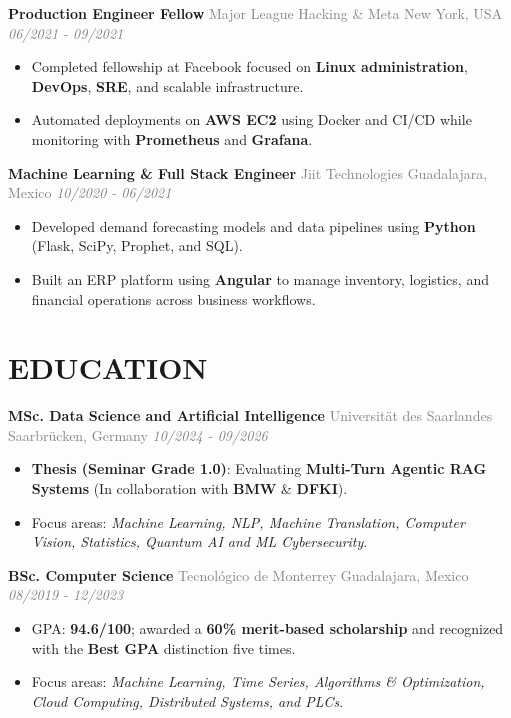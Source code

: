 \documentclass[a4paper]{article}
\newcommand{\entrytitle}[1]{{\fontsize{12pt}{13.2pt}\selectfont\textbf{#1}}}
\begin{document}
\vspace{0.1cm}
\entrytitle{Production Engineer Fellow} {\small \textcolor{graytext}{Major League Hacking \& Meta} \hfill \textcolor{graytext}{New York, USA \quad \textit{06/2021 - 09/2021}}}
\begin{itemize}
  \item Completed fellowship at Facebook focused on \textbf{Linux administration}, \textbf{DevOps}, \textbf{SRE}, and scalable infrastructure.
  \item Automated deployments on \textbf{AWS EC2} using Docker and CI/CD while monitoring with \textbf{Prometheus} and \textbf{Grafana}.
\end{itemize}

\vspace{0.1cm}
\entrytitle{Machine Learning \& Full Stack Engineer} {\small \textcolor{graytext}{Jiit Technologies} \hfill \textcolor{graytext}{Guadalajara, Mexico \quad \textit{10/2020 - 06/2021}}}
\begin{itemize}
  \item Developed demand forecasting models and data pipelines using \textbf{Python} (Flask, SciPy, Prophet, and SQL).
  \item Built an ERP platform using \textbf{Angular} to manage inventory, logistics, and financial operations across business workflows.
\end{itemize}

\section*{EDUCATION}

\entrytitle{MSc. Data Science and Artificial Intelligence} {\small \textcolor{graytext}{Universität des Saarlandes} \hfill \textcolor{graytext}{Saarbrücken, Germany \quad \textit{10/2024 - 09/2026}}}
\begin{itemize}
  \item \textbf{Thesis (Seminar Grade 1.0)}: Evaluating \textbf{Multi-Turn Agentic RAG Systems} (In collaboration with \textbf{BMW} \& \textbf{DFKI}).
  \item Focus areas: \textit{Machine Learning, NLP, Machine Translation, Computer Vision, Statistics, Quantum AI and ML Cybersecurity}.
\end{itemize}

\vspace{0.1cm}
\entrytitle{BSc. Computer Science} {\small \textcolor{graytext}{Tecnológico de Monterrey} \hfill \textcolor{graytext}{Guadalajara, Mexico \quad \textit{08/2019 - 12/2023}}}
\begin{itemize}
  \item GPA: \textbf{94.6/100}; awarded a \textbf{60\% merit-based scholarship} and recognized with the \textbf{Best GPA} distinction five times.
  \item Focus areas: \textit{Machine Learning, Time Series, Algorithms \& Optimization, Cloud Computing, Distributed Systems, and PLCs}.
\end{itemize}
\end{document}
